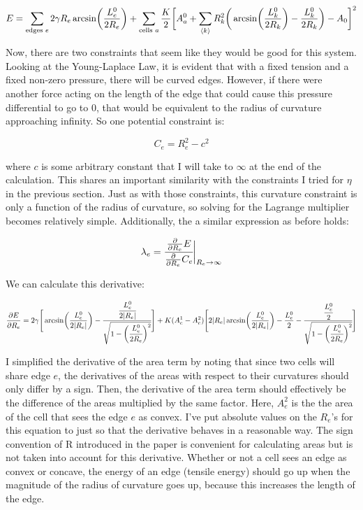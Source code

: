 \documentclass[12pt]{article}
\begin{document}
\begin{center}
\begin{equation}
\label{eqn: radiienergy}
E = \sum\limits_{\text{edges }e} 2 \gamma R_e \arcsin(\frac{L_e^0}{2 R_e}) + \sum\limits_{\text{cells }a} \frac{K}{2} \bigg[ A_a^0 + \sum\limits_{\expval{k}} R_k^2\bigg(\arcsin(\frac{L_k^0}{2 R_k}) - \frac{L_k^0}{2 R_k}\bigg) - A_0\bigg]^2
\end{equation}
\end{center}
Now, there are two constraints that seem like they would be good for this system. Looking at the Young-Laplace Law, it is evident that with a fixed tension and a fixed non-zero pressure, there will be curved edges. However, if there were another force acting on the length of the edge that could cause this pressure differential to go to $0$, that would be equivalent to the radius of curvature approaching infinity. So one potential constraint is:
\begin{center}
\begin{equation}
C_e = R_e^2 - c^2
\end{equation}
\end{center}
where $c$ is some arbitrary constant that I will take to $\infty$ at the end of the calculation. This shares an important similarity with the constraints I tried for $\eta$ in the previous section. Just as with those constraints, this curvature constraint is only a function of the radius of curvature, so solving for the Lagrange multiplier becomes relatively simple. Additionally, the a similar expression as before holds:
\begin{center}
\begin{equation}
\lambda_e = \cfrac{\pdv{R_e}E}{\pdv{R_e}C_e}\bigg\vert_{R_e \to \infty}
\end{equation}
\end{center}
We can calculate this derivative:
\begin{center}
\begin{equation}
\label{eqn: dedr}
\pdv{E}{R_e} = 2\gamma\Bigg[\arcsin(\frac{L_e^0}{2 |R_e|}) - \cfrac{\cfrac{L_e^0}{2 |R_e|}}{\sqrt{1 - \bigg(\cfrac{L_e^0}{2 R_e}\bigg)^2}}\Bigg] + K(A_e^1 - A_e^2)\Bigg[2 |R_e| \arcsin(\frac{L_e^0}{2 |R_e|}) -\frac{L_e^0}{2} - \cfrac{\cfrac{L_e^0}{2}}{\sqrt{1 - \bigg(\cfrac{L_e^0}{2 R_e}\bigg)^2}}\Bigg]
\end{equation}
\end{center}
I simplified the derivative of the area term by noting that since two cells will share edge $e$, the derivatives of the areas with respect to their curvatures should only differ by a sign. Then, the derivative of the area term should effectively be the difference of the areas multiplied by the same factor. Here, $A_e^2$ is the the area of the cell that sees the edge $e$ as convex. I've put absolute values on the $R_e$'s for this equation to just so that the derivative behaves in a reasonable way. The sign convention of R introduced in the paper is convenient for calculating areas but is not taken into account for this derivative. Whether or not a cell sees an edge as convex or concave, the energy of an edge (tensile energy) should go up when the magnitude of the radius of curvature goes up, because this increases the length of the edge.\\ \\
\end{document}
